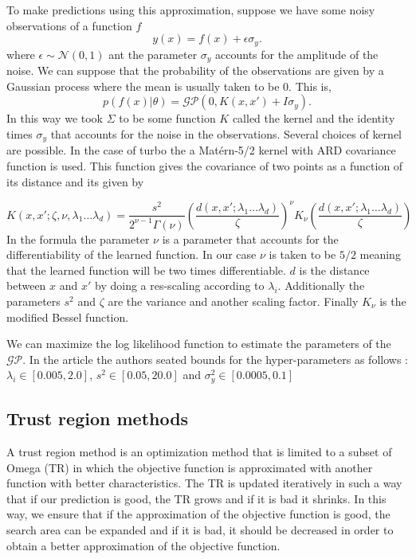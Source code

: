 \documentclass{article}
\begin{document}
To make predictions using this approximation, suppose we have some noisy observations of a function $f$ $$y(x) = f(x)+ \epsilon \sigma_y.$$ where $\epsilon \sim \mathcal{N}(0,1)$ ant the parameter $\sigma_y$ accounts for the amplitude of the noise. We can suppose that the probability of the observations are given by a Gaussian process where the mean is usually taken to be 0. This is, 
\begin{equation*}
    p(f(x)|\theta) = \mathcal{GP}(0,K(x,x') + I\sigma_y).
\end{equation*}
In this way we took $\Sigma$ to be some function $K$ called the kernel and the identity times $\sigma_y$ that accounts for the noise in the observations. Several choices of kernel are possible. In the case of turbo the a Matérn-5/2 kernel with ARD covariance function is used. This function gives the covariance of two points as a function of its distance and its given by

$$
K(x, x' ; \zeta, \nu, \lambda_1 \dots \lambda_d)=\frac{s^2}{2^{\nu-1} \Gamma(\nu)}\left(\frac{d(x, x' ; \lambda_1 \dots \lambda_d)}{\zeta}\right)^\nu K_\nu\left(\frac{d(x, x' ; \lambda_1 \dots \lambda_d)}{\zeta}\right)
$$
In the formula the parameter $\nu $ is a parameter that accounts for the differentiability of the learned function. In our case $\nu$ is taken to be $5/2$ meaning that the learned function will be two times differentiable. $d$ is the distance between $x$ and $x'$ by doing a res-scaling according to $\lambda_{i}$. Additionally the parameters $s^2$ and $\zeta$ are the variance and another scaling factor. Finally $K_{\nu}$ is the modified Bessel function. 

 We can maximize the log likelihood function to estimate the parameters of the $\mathcal{GP}$. In the article the authors seated bounds for the hyper-parameters as follows : $\lambda_i \in [0.005,2.0]$, $s^2 \in [0.05, 20.0]$ and $\sigma^2_y \in [0.0005,0.1]$


 

\subsection{Trust region methods}

A trust region method is an optimization method that is limited to a subset of Omega (TR) in which the objective function is approximated with another function with better characteristics. The TR is updated iteratively in such a way that if our prediction is good, the TR grows and if it is bad it shrinks. In this way, we ensure that if the approximation of the objective function is good, the search area can be expanded and if it is bad, it should be decreased in order to obtain a better approximation of the objective function.
\end{document}
